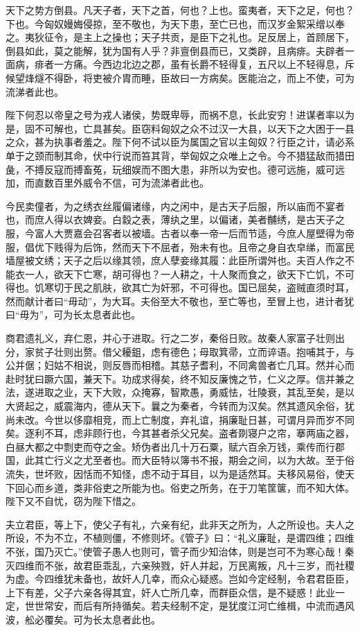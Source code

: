 \documentclass[UTF8,titlepage,oneside]{ctexbook}
\begin{document}
天下之势方倒县。凡天子者，天下之首，何也？上也。蛮夷者，天下之足，何也？下也。今匈奴嫚娒侵掠，至不敬也，为天下患，至亡已也，而汉岁金絮采缯以奉之。夷狄征令，是主上之操也；天子共贡，是臣下之礼也。足反居上，首顾居下，倒县如此，莫之能解，犹为国有人乎？非亶倒县而已，又类辟，且病痱。夫辟者一面病，痱者一方痛。今西边北边之郡，虽有长爵不轻得复，五尺以上不轻得息，斥候望烽燧不得卧，将吏被介胄而睡，臣故曰一方病矣。医能治之，而上不使，可为流涕者此也。


陛下何忍以帝皇之号为戎人诸侯，势既卑辱，而祸不息，长此安穷！进谋者率以为是，固不可解也，亡具甚矣。臣窃料匈奴之众不过汉一大县，以天下之大困于一县之众，甚为执事者羞之。陛下何不试以臣为属国之官以主匈奴？行臣之计，请必系单于之颈而制其命，伏中行说而笞其背，举匈奴之众唯上之令。今不猎猛敌而猎田彘，不搏反寇而搏畜菟，玩细娱而不图大患，非所以为安也。德可远施，威可远加，而直数百里外威令不信，可为流涕者此也。


今民卖僮者，为之绣衣丝履偏诸缘，内之闲中，是古天子后服，所以庙而不宴者也，而庶人得以衣婢妾。白縠之表，薄纨之里，以偏诸，美者黼绣，是古天子之服，今富人大贾嘉会召客者以被墙。古者以奉一帝一后而节适，今庶人屋壁得为帝服，倡优下贱得为后饰，然而天下不屈者，殆未有也。且帝之身自衣皁绨，而富民墙屋被文绣；天子之后以缘其领，庶人孽妾缘其履：此臣所谓舛也。夫百人作之不能衣一人，欲天下亡寒，胡可得也？一人耕之，十人聚而食之，欲天下亡饥，不可得也。饥寒切于民之肌肤，欲其亡为奸邪，不可得也。国已屈矣，盗贼直须时耳，然而献计者曰“毋动”，为大耳。夫俗至大不敬也，至亡等也，至冒上也，进计者犹曰“毋为”，可为长太息者此也。


商君遗礼义，弃仁恩，并心于进取。行之二岁，秦俗日败。故秦人家富子壮则出分，家贫子壮则出赘。借父耰鉏，虑有德色；母取箕帚，立而谇语。抱哺其于，与公并倨；妇姑不相说，则反唇而相稽。其慈子耆利，不同禽兽者亡几耳。然并心而赴时犹曰蹶六国，兼天下。功成求得矣，终不知反廉愧之节，仁义之厚。信并兼之法，遂进取之业，天下大败，众掩寡，智欺愚，勇威怯，壮陵衰，其乱至矣，是以大贤起之，威震海内，德从天下。曩之为秦者，今转而为汉矣。然其遗风余俗，犹尚未改。今世以侈靡相竞，而上亡制度，弃礼谊，捐廉耻日甚，可谓月异而岁不同矣。逐利不耳，虑非顾行也，今其甚者杀父兄矣。盗者剟寝户之帘，搴两庙之器，白昼大都之中剽吏而夺之金。矫伪者出几十万石粟，赋六百余万钱，乘传而行郡国，此其亡行义之尤至者也。而大臣特以簿书不报，期会之间，以为大故。至于俗流失，世坏败，因恬而不知怪，虑不动于耳目，以为是适然耳。夫移风易俗，使天下回心而乡道，类非俗吏之所能为也。俗吏之所务，在于刀笔筐箧，而不知大体。陛下又不自忧，窃为陛下惜之。


夫立君臣，等上下，使父子有礼，六亲有纪，此非天之所为，人之所设也。夫人之所设，不为不立，不植则僵，不修则坏。《管子》曰：“礼义廉耻，是谓四维；四维不张，国乃灭亡。”使管子愚人也则可，管子而少知治体，则是岂可不为寒心哉！秦灭四维而不张，故君臣乖乱，六亲殃戮，奸人并起，万民离叛，凡十三岁，而社稷为虚。今四维犹未备也，故奸人几幸，而众心疑惑。岂如今定经制，令君君臣臣，上下有差，父子六亲各得其宜，奸人亡所几幸，而群臣众信，是不疑惑！此业一定，世世常安，而后有所持循矣。若夫经制不定，是犹度江河亡维楫，中流而遇风波，舩必覆矣。可为长太息者此也。
\end{document}
